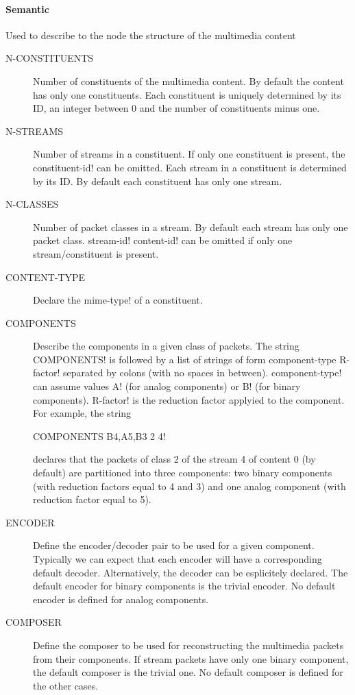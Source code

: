 \documentclass{medusabook}
\begin{document}
\paragraph{Semantic}
\label{subsub:1.3.1.1;medusa_book}
 Used to describe to the node the structure of the
  multimedia content
  \begin{description}
    \item[N-CONSTITUENTS] Number of constituents of the multimedia
    content.  By default the content has only one constituents.  Each
    constituent is uniquely determined by its ID, an integer between 0
    and the number of constituents minus one.
    \item[N-STREAMS] Number of streams in a constituent.  If only one
    constituent is present, the \ttt constituent-id! can be omitted.
    Each stream in a constituent is determined by its ID. By default
    each constituent has only one stream. 
    \item[N-CLASSES] Number of packet classes in a stream.  By default
    each stream has only one packet class.  \ttt stream-id! \ttt
    content-id! can be omitted if only one stream/constituent is present.
    \item[CONTENT-TYPE] Declare the \ttt mime-type! of a constituent.
    \item[COMPONENTS] Describe the components in a given class of
    packets.  The string \ttt COMPONENTS! is followed by a list of
    strings of form \ttt component-type R-factor! separated by colons
    (with no spaces in between).  \ttt component-type! can assume
    values \ttt A! (for analog components) or \ttt B! (for binary
    components).  \ttt R-factor! is the reduction factor applyied to
    the component.  For example, the string

    \begin{center}
      \ttt COMPONENTS B4,A5,B3 2 4!
    \end{center}
    declares that the packets of class 2 of the stream 4 of content 0
    (by default) are partitioned into three components: two binary
    components (with reduction factors equal to 4 and 3) and one
    analog component (with reduction factor equal to 5).
    \item[ENCODER] Define the encoder/decoder pair to be used for a
    given component.   Typically we can expect that each encoder will
    have a corresponding default decoder.  Alternatively, the decoder
    can be esplicitely declared.  The default encoder for binary
    components is the trivial encoder.  No default encoder is defined
    for analog components.
    \item[COMPOSER] Define the composer to be used for reconstructing
    the multimedia packets from their components.  If stream packets
    have only one binary component, the default composer is the
    trivial one.  No default composer is defined for the other cases.
  \end{description}
\end{document}

